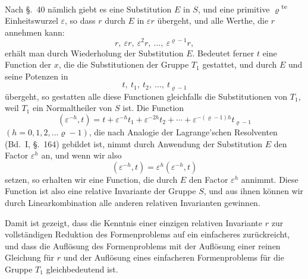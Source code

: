 \documentclass[12pt,a4paper]{article}
\theoremstyle{plain}
\theoremstyle{definition}
\theoremstyle{remark}
\begin{document}
Nach \S.~40 nämlich giebt es eine Substitution $E$ in $S$, und eine primitive $\varrho$\textsuperscript{te} Einheitswurzel $\varepsilon$, so dass $r$ durch $E$ in $\varepsilon r$ übergeht, und alle Werthe, die $r$ annehmen kann:
\[
r,\ \varepsilon r,\ \varepsilon^{2}r,\ \ldots,\ \varepsilon^{\varrho-1}r,
\]
erhält man durch Wiederholung der Substitution $E$. Bedeutet ferner $t$ eine Function der $x$, die die Substitutionen der Gruppe $T_{1}$ gestattet, und durch $E$ und seine Potenzen in
\[
t,\ t_{1},\ t_{2},\ \ldots,\ t_{\varrho-1}
\]
übergeht, so gestatten alle diese Functionen gleichfalls die Substitutionen von $T_{1}$, weil $T_{1}$ ein Normaltheiler von $S$ ist. Die Function
\begin{equation}
(\varepsilon^{-h}, t) = t + \varepsilon^{-h}t_{1} + \varepsilon^{-2h}t_{2} + \cdots + \varepsilon^{-(\varrho-1)h}t_{\varrho-1}
\end{equation}
$(h = 0, 1, 2, \ldots \varrho-1)$, die nach Analogie der Lagrange'schen Resolventen (Bd.~I, \S.~164) gebildet ist, nimmt durch Anwendung der Substitution $E$ den Factor $\varepsilon^{h}$ an, und wenn wir also
\[
(\varepsilon^{-h}, t) = \varepsilon^{h}(\varepsilon^{-h}, t)
\]
setzen, so erhalten wir eine Function, die durch $E$ den Factor $\varepsilon^{h}$ annimmt. Diese Function ist also eine relative Invariante der Gruppe $S$, und aus ihnen können wir durch Linearkombination alle anderen relativen Invarianten gewinnen.

Damit ist gezeigt, dass die Kenntnis einer einzigen relativen Invariante $r$ zur vollständigen Reduktion des Formenproblems auf ein einfacheres zurückreicht, und dass die Auflösung des Formenproblems mit der Auflösung einer reinen Gleichung für $r$ und der Auflösung eines einfacheren Formenproblems für die Gruppe $T_{1}$ gleichbedeutend ist.
\end{document}
